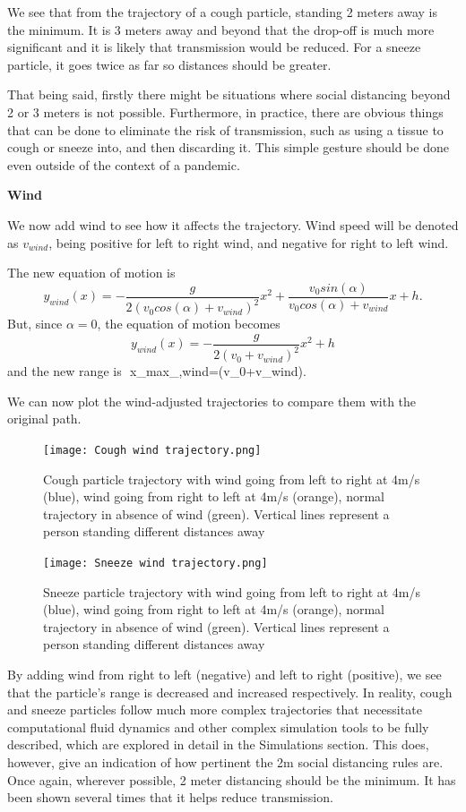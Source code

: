 \documentclass[11pt]{report}
\begin{document}
We see that from the trajectory of a cough particle, standing 2 meters away is the minimum.  It is 3 meters away and beyond that the drop-off is much more significant and it is likely that transmission would be reduced. 
For a sneeze particle, it goes twice as far so distances should be greater.

That being said, firstly there might be situations where social distancing beyond 2 or 3 meters is not possible. Furthermore, in practice, there are obvious things that can be done to eliminate the risk of transmission, such as using a tissue to cough or sneeze into, and then discarding it. This simple gesture should be done even outside of the context of a pandemic.

\textbf{Wind}

We now add wind to see how it affects the trajectory. Wind speed will be denoted as $v_{wind}$, being positive for left to right wind, and negative for right to left wind.

The new equation of motion is 
$$
y_{wind}(x)=-\frac{g}{2(v_0cos(\alpha)+v_{wind})^2}x^2+\frac{v_0sin(\alpha)}{v_0cos(\alpha)+v_{wind}}x+h.
$$
But, since $\alpha=0$, the equation of motion becomes
$$
y_{wind}(x)=-\frac{g}{2(v_0+v_{wind})^2}x^2+h
$$
and the new range is
$$
x_{max}_{,wind}=(v_0+v_{wind}).

We can now plot the wind-adjusted trajectories to compare them with the original path.

\begin{figure}[h!]
    \centering
    \texttt{[image: Cough wind trajectory.png]}
    \caption{ Cough particle trajectory with wind going from left to right at 4m/s (blue), wind going from right to left at 4m/s (orange), normal trajectory in absence of wind (green). Vertical lines represent a person standing different distances away}
    
\end{figure}

\begin{figure}[h!]
    \centering
    \texttt{[image: Sneeze wind trajectory.png]}
    \caption{Sneeze particle trajectory with wind going from left to right at 4m/s (blue), wind going from right to left at 4m/s (orange), normal trajectory in absence of wind (green). Vertical lines represent a person standing different distances away}
    
\end{figure}

By adding wind from right to left (negative) and left to right (positive), we see that the particle’s range is decreased and increased respectively.  
In reality, cough and sneeze particles follow much more complex trajectories that necessitate computational fluid dynamics and other complex simulation tools to be fully described, which are explored in detail in the Simulations section. This does, however, give an indication of how pertinent the 2m social distancing rules are. Once again, wherever possible, 2 meter distancing should be the minimum. It has been shown several times that it helps reduce transmission.
\end{document}
